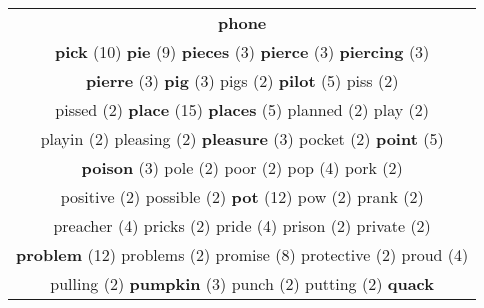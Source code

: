 \documentclass[12pt,a4paper]{article}
\begin{document}
\begin{center}
\begin{longtable}{|c|}
\textcolor{AzulEscuro} {\bf phone}} \footnotesize{(10)}  \\ {\Huge \textcolor{AzulEscuro} {\bf pick}} \footnotesize{(10)} {\Huge \textcolor{AzulEscuro} {\bf pie}} \footnotesize{(9)} {\small \textcolor{Laranja} {\bf pieces}} \footnotesize{(3)} {\small \textcolor{Laranja} {\bf pierce}} \footnotesize{(3)} {\small \textcolor{Laranja} {\bf piercing}} \footnotesize{(3)}  \\ {\small \textcolor{Laranja} {\bf pierre}} \footnotesize{(3)} {\small \textcolor{Laranja} {\bf pig}} \footnotesize{(3)} {\footnotesize \textcolor{Verde} {pigs}} \footnotesize{(2)} {\large \textcolor{Roxo} {\bf pilot}} \footnotesize{(5)} {\footnotesize \textcolor{Verde} {piss}} \footnotesize{(2)}  \\ {\footnotesize \textcolor{Verde} {pissed}} \footnotesize{(2)} {\Huge \textcolor{AzulEscuro} {\bf place}} \footnotesize{(15)} {\large \textcolor{Roxo} {\bf places}} \footnotesize{(5)} {\footnotesize \textcolor{Verde} {planned}} \footnotesize{(2)} {\footnotesize \textcolor{Verde} {play}} \footnotesize{(2)}  \\ {\footnotesize \textcolor{Verde} {playin}} \footnotesize{(2)} {\footnotesize \textcolor{Verde} {pleasing}} \footnotesize{(2)} {\small \textcolor{Laranja} {\bf pleasure}} \footnotesize{(3)} {\footnotesize \textcolor{Verde} {pocket}} \footnotesize{(2)} {\large \textcolor{Roxo} {\bf point}} \footnotesize{(5)}  \\ {\small \textcolor{Laranja} {\bf poison}} \footnotesize{(3)} {\footnotesize \textcolor{Verde} {pole}} \footnotesize{(2)} {\footnotesize \textcolor{Verde} {poor}} \footnotesize{(2)} {\normalsize \textcolor{VerdeLocao} {pop}} \footnotesize{(4)} {\footnotesize \textcolor{Verde} {pork}} \footnotesize{(2)}  \\ {\footnotesize \textcolor{Verde} {positive}} \footnotesize{(2)} {\footnotesize \textcolor{Verde} {possible}} \footnotesize{(2)} {\Huge \textcolor{AzulEscuro} {\bf pot}} \footnotesize{(12)} {\footnotesize \textcolor{Verde} {pow}} \footnotesize{(2)} {\footnotesize \textcolor{Verde} {prank}} \footnotesize{(2)}  \\ {\normalsize \textcolor{VerdeLocao} {preacher}} \footnotesize{(4)} {\footnotesize \textcolor{Verde} {pricks}} \footnotesize{(2)} {\normalsize \textcolor{VerdeLocao} {pride}} \footnotesize{(4)} {\footnotesize \textcolor{Verde} {prison}} \footnotesize{(2)} {\footnotesize \textcolor{Verde} {private}} \footnotesize{(2)}  \\ {\Huge \textcolor{AzulEscuro} {\bf problem}} \footnotesize{(12)} {\footnotesize \textcolor{Verde} {problems}} \footnotesize{(2)} {\huge \textcolor{Amarelo} {promise}} \footnotesize{(8)} {\footnotesize \textcolor{Verde} {protective}} \footnotesize{(2)} {\normalsize \textcolor{VerdeLocao} {proud}} \footnotesize{(4)}  \\ {\footnotesize \textcolor{Verde} {pulling}} \footnotesize{(2)} {\small \textcolor{Laranja} {\bf pumpkin}} \footnotesize{(3)} {\footnotesize \textcolor{Verde} {punch}} \footnotesize{(2)} {\footnotesize \textcolor{Verde} {putting}} \footnotesize{(2)} {\large \textcolor{Roxo} {\bf quack}} 
\end{longtable}
\end{center}
\end{document}
